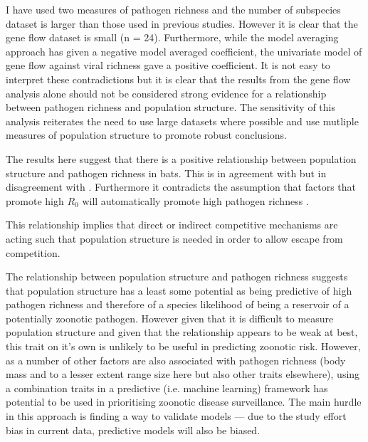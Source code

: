 I have used two measures of pathogen richness and the number of subspecies dataset is larger than those used in previous studies.
However it is clear that the gene flow dataset is small (n = 24).
Furthermore, while the model averaging approach has given a negative model averaged coefficient, the univariate model of gene flow against viral richness gave a positive coefficient.
It is not easy to interpret these contradictions but it is clear that the results from the gene flow analysis alone should not be considered strong evidence for a relationship between pathogen richness and population structure.
The sensitivity of this analysis reiterates the need to use large datasets where possible and use mutliple measures of population structure to promote robust conclusions.


The results here suggest that there is a positive relationship between population structure and pathogen richness in bats.
This is in agreement with \cite{maganga2014bat, turmelle2009correlates} but in disagreement with \cite{gay2014parasite}.
Furthermore it contradicts the assumption that factors that promote high $R_0$ will automatically promote high pathogen richness \cite{nunn2003comparative, morand2000wormy}.

This relationship implies that direct or indirect competitive mechanisms are acting such that population structure is needed in order to allow escape from competition.

The relationship between population structure and pathogen richness suggests that population structure has a least some potential as being predictive of high pathogen richness and therefore of a species likelihood of being a reservoir of a potentially zoonotic pathogen. 
However given that it is difficult to measure population structure and given that the relationship appears to be weak at best, this trait on it's own is unlikely to be useful in predicting zoonotic risk.
However, as a number of other factors are also associated with pathogen richness (body mass and to a lesser extent range size here but also other traits elsewhere), using a combination traits in a predictive (i.e. machine learning) framework has potential to be used in prioritising zoonotic disease surveillance.
The main hurdle in this approach is finding a way to validate models --- due to the study effort bias in current data, predictive models will also be biased.

